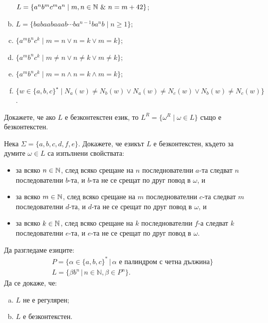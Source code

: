 \begin{problem}
\begin{enumerate}[a)]
    $L = \{a^nb^mc^ma^n \mid m,n\in\mathbb{N}\ \&\ n = m+42\}$;
  \item
    $L = \{babaabaaab\cdots ba^{n-1}ba^nb \mid n \geq 1\}$;
  \item
    $\{a^mb^nc^k\mid m = n \vee n = k \vee m = k\}$;
  \item
    $\{a^mb^nc^k\mid m \neq n \vee n \neq k \vee m \neq k\}$;
  \item
    $\{a^mb^nc^k\mid m = n \wedge n = k \wedge m = k\}$;
  \item
    $\{w \in \{a,b,c\}^\star\mid N_a(w) \neq N_b(w) \vee N_a(w) \neq N_c(w) \vee N_b(w) \neq N_c(w)\}$.
  \end{enumerate}
\end{problem}

\begin{problem}
  Докажете, че ако $L$ е безконтекстен език, то $L^R = \{\omega^R \mid \omega \in L\}$ 
  също е безконтекстен.
\end{problem}

\begin{problem}
  Нека $\Sigma = \{a,b,c,d,f,e\}$.
  Докажете, че езикът $L$ е безконтекстен, където за думите $\omega \in L$ са изпълнени свойствата:
  \begin{itemize}[-]
  \item 
    за всяко $n\in\mathbb{N}$, след всяко срещане на $n$ последнователни $a$-та
    следват $n$ последователни $b$-та, и $b$-та не се срещат по друг повод в $\omega$, и
  \item
    за всяко $m\in\mathbb{N}$, след всяко срещане на $m$ последнователни $c$-та
    следват $m$ последователни $d$-та, и $d$-та не се срещат по друг повод в $\omega$, и
  \item
    за всяко $k\in\mathbb{N}$, след всяко срещане на $k$ последнователни $f$-а
    следват $k$ последователни $e$-та, и $e$-та не се срещат по друг повод в $\omega$.
  \end{itemize}
\end{problem}

\begin{problem}
  Да разгледаме езиците:
  \begin{align*}
    & P = \{\alpha\in\{a,b,c\}^*\,|\, \alpha \text{ е палиндром с четна дължина}\} \\
    & L =  \{\beta b^n\,|\, n\in\mathbb{N}, \beta\in P^n\}.
  \end{align*}
  Да се докаже, че:
  \begin{enumerate}[a)]
  \item 
    $L$ не е регулярен;
  \item 
    $L$ е безконтекстен.
  \end{enumerate}
\end{problem}

